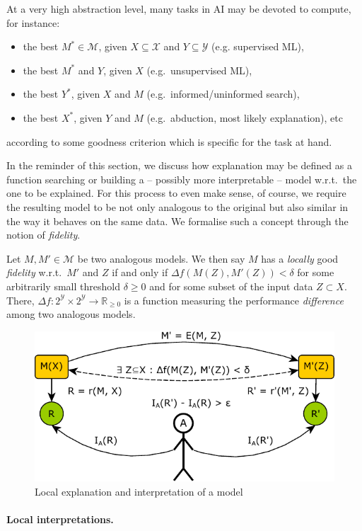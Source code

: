 \documentclass[12pt,a4paper,openright,twoside]{book}
\begin{document}
At a very high abstraction level, many tasks in AI may be devoted to compute, for instance:
%
\begin{itemize}
    \item the best $M^* \in \mathcal{M}$, given $X \subseteq \mathcal{X}$ and $Y \subseteq \mathcal{Y}$ (e.g. supervised ML),
    \item the best $M^*$ and $Y$, given $X$ (e.g.\ unsupervised ML),
    \item the best $Y^*$, given $X$ and $M$ (e.g.\ informed/uninformed search),
    \item the best $X^*$, given $Y$ and $M$ (e.g.\  abduction, most likely explanation), etc 
\end{itemize}
%
according to some goodness criterion which is specific for the task at hand.

In the reminder of this section, we discuss how explanation may be defined as a function searching or building a -- possibly more interpretable -- model w.r.t.\ the one to be explained.
%
For this process to even make sense, of course, we require the resulting model to be not only analogous to the original but also similar in the way it behaves on the same data.
%
We formalise such a concept through the notion of \emph{fidelity}.

Let $M, M' \in \mathcal{M}$ be two analogous models.
%
We then say $M$ has a \emph{locally} good \emph{fidelity} w.r.t.\ $M'$ and $Z$ if and only if $\Delta f(M(Z), M'(Z)) < \delta$ for some arbitrarily small threshold $\delta \geq 0$ and for some subset of the input data $Z \subset X$.
%
There, $\Delta f : 2^\mathcal{Y} \times 2^\mathcal{Y} \rightarrow \mathbb{R}_{\geq 0}$ is a function measuring the performance \emph{difference} among two analogous models.

\begin{figure}
    \centering
    \includegraphics[width=.5\linewidth]{figures/local.pdf}
    \caption{Local explanation and interpretation of a model}
    \label{fig:local}
\end{figure}

\paragraph{Local interpretations.}
\end{document}
